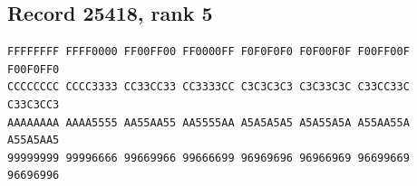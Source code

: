 \documentclass[11pt]{amsart}
\theoremstyle{definition}
\theoremstyle{remark}
\numberwithin{equation}{section}
\numberwithin{table}{section}
\begin{document}
\subsection*{Record 25418, rank 5}
\begin{Verbatim}[fontsize=\scriptsize,xleftmargin=1em]
FFFFFFFF FFFF0000 FF00FF00 FF0000FF F0F0F0F0 F0F00F0F F00FF00F F00F0FF0
CCCCCCCC CCCC3333 CC33CC33 CC3333CC C3C3C3C3 C3C33C3C C33CC33C C33C3CC3
AAAAAAAA AAAA5555 AA55AA55 AA5555AA A5A5A5A5 A5A55A5A A55AA55A A55A5AA5
99999999 99996666 99669966 99666699 96969696 96966969 96699669 96696996
\end{Verbatim}
\par
{}\par
\end{document}

